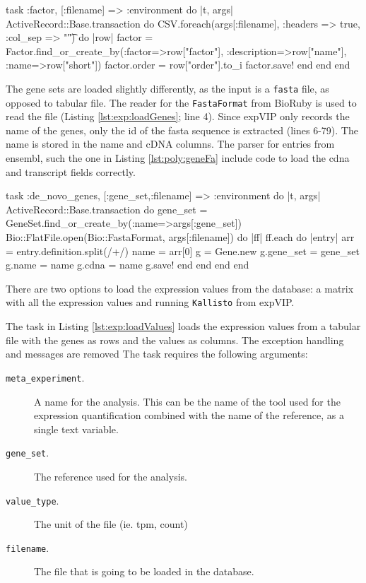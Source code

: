 \begin{code}[language=ruby, caption={[Load factors]Task that loads factors}, label=lst:exp:laodFactor]
task :factor, [:filename] => :environment do |t, args|
  ActiveRecord::Base.transaction do 
    CSV.foreach(args[:filename], :headers => true, :col_sep => "\t") do |row|
      factor = Factor.find_or_create_by(:factor=>row["factor"],  :description=>row["name"],  :name=>row["short"])
      factor.order = row["order"].to_i
      factor.save!
    end
  end
end
\end{code}

The gene sets are loaded slightly differently, as the input is a \verb|fasta| file, as opposed to tabular file. 
The reader for the \verb|FastaFormat| from BioRuby \citep{Goto2010} is used to read the file (Listing \ref{lst:exp:loadGenes}; line 4). 
Since expVIP only records the name of the genes, only the id of the fasta sequence is extracted (lines 6-79). 
The name is stored in the name and cDNA columns. 
The parser for entries from ensembl, such the one in Listing \ref{lst:poly:geneFa} include code to load the \acrshort{cdna} and transcript fields correctly. 

\begin{code}[language=ruby, caption={[Load genes from Fasta]Task that load genes from a Fasta File}, label=lst:exp:loadGenes]
task :de_novo_genes, [:gene_set,:filename] => :environment do |t, args|
  ActiveRecord::Base.transaction do
    gene_set = GeneSet.find_or_create_by(:name=>args[:gene_set])
    Bio::FlatFile.open(Bio::FastaFormat, args[:filename]) do |ff|
      ff.each do |entry| 
        arr = entry.definition.split(/\s+/)
        name = arr[0]
        g = Gene.new 
        g.gene_set = gene_set
        g.name = name
        g.cdna = name
        g.save!
      end
    end
  end
end
\end{code}

There are two options to load the expression values from the database: a matrix with all the expression values and running \verb|Kallisto| from expVIP. 

The task in Listing \ref{lst:exp:loadValues} loads the expression values from a tabular file with the genes as rows and the values as columns. 
The exception handling and messages are removed 
The task requires the following arguments:

\begin{description}
\item[\texttt{meta\_experiment}.] A name for the analysis. This can be the name of the tool used for the expression quantification combined with the name of the reference, as a single text variable. 
\item[\texttt{gene\_set}.] The reference used for the analysis. 
\item[\texttt{value\_type}.] The unit of the file (ie.  \acrshort{tpm}, count)
\item[\texttt{filename}.] The file that is going to be loaded in the database. 
\end{description}

